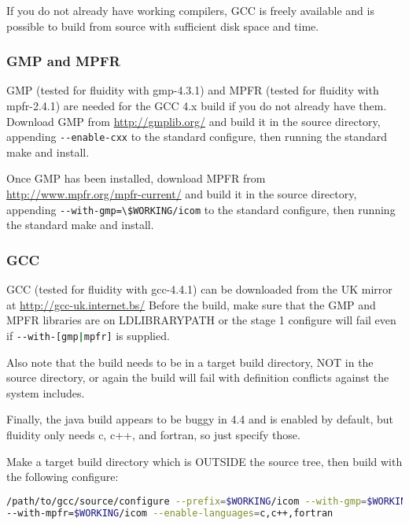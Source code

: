 If you do not already have working compilers, GCC is freely available and is
possible to build from source with sufficient disk space and time.

\subsubsection{GMP and MPFR}
\label{sect:required_libraries_compilers_gmp_mpfr}

GMP (tested for fluidity with gmp-4.3.1) and MPFR (tested for fluidity with
mpfr-2.4.1) are needed for the GCC 4.x build if you do not already have them.
Download GMP from \url{http://gmplib.org/} and build it in the source
directory, appending \lstinline[language=bash]+--enable-cxx+ to the standard
configure, then running the standard make and install.

Once GMP has been installed, download MPFR from
\url{http://www.mpfr.org/mpfr-current/} and build it in the source directory,
appending \lstinline[language=bash]+--with-gmp=\$WORKING/icom+ to the standard
configure, then running the standard make and install.

\subsubsection{GCC}
\label{sect:required_libraries_compilers_gcc}

GCC (tested for fluidity with gcc-4.4.1) can be downloaded from the UK mirror
at \url{http://gcc-uk.internet.bs/} Before the build, make sure that the GMP
and MPFR libraries are on LD{\textunderscore}LIBRARY{\textunderscore}PATH or
the stage 1 configure will fail even if
\lstinline[language=bash]+--with-[gmp|mpfr]+ is supplied.

Also note that the build needs to be in a target build directory, NOT in the
source directory, or again the build will fail with definition conflicts
against the system includes.

Finally, the java build appears to be buggy in 4.4 and is enabled by default,
but fluidity only needs c, c++, and fortran, so just specify those.

Make a target build directory which is OUTSIDE the source tree, then build
with the following configure:

\begin{lstlisting}[language=bash]
/path/to/gcc/source/configure --prefix=$WORKING/icom --with-gmp=$WORKING/icom
--with-mpfr=$WORKING/icom --enable-languages=c,c++,fortran
\end{lstlisting}

